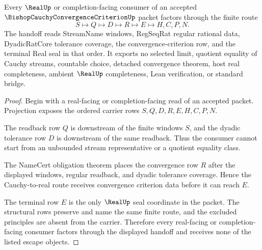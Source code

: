 \begin{theorem}
\label{thm:bishop-cauchy-convergence-criterion-real-handoff}
Every $\RealUp$ or completion-facing consumer of an accepted $\BishopCauchyConvergenceCriterionUp$ packet factors through the finite route
$$
S \longmapsto Q \longmapsto D \longmapsto R \longmapsto E \longmapsto H,C,P,N .
$$
The handoff reads StreamName windows, RegSeqRat regular rational data, DyadicRatCore tolerance coverage, the convergence-criterion row, and the terminal Real seal in that order. It exports no selected limit, quotient equality of Cauchy streams, countable choice, detached convergence theorem, host real completeness, ambient $\RealUp$ completeness, Lean verification, or standard bridge.
\end{theorem}
\begin{proof}
Begin with a real-facing or completion-facing read of an accepted packet. Projection exposes the ordered carrier rows $S,Q,D,R,E,H,C,P,N$.

The readback row $Q$ is downstream of the finite windows $S$, and the dyadic tolerance row $D$ is downstream of the same readback. Thus the consumer cannot start from an unbounded stream representative or a quotient equality class.

The NameCert obligation theorem places the convergence row $R$ after the displayed windows, regular readback, and dyadic tolerance coverage. Hence the Cauchy-to-real route receives convergence criterion data before it can reach $E$.

The terminal row $E$ is the only $\RealUp$ seal coordinate in the packet. The structural rows preserve and name the same finite route, and the excluded principles are absent from the carrier. Therefore every real-facing or completion-facing consumer factors through the displayed handoff and receives none of the listed escape objects.
\end{proof}

